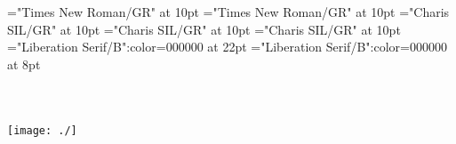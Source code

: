 \documentclass[a4paper,twoside]{article}
\begin{document}
\font\xitemptdefinitionLcptsensesensesentryletDatadicBody="Times New Roman/GR" at 10pt
\font\spanptxitemptdefinitionLcptsensesensesentryletDatadicBody="Times New Roman/GR" at 10pt
\font\spanendefinitionLcptsensesensesentryletDatadicBody="Charis SIL/GR" at 10pt
\font\xitemendefinitionLcptsensesensesentryletDatadicBody="Charis SIL/GR" at 10pt
\font\spanenxitemendefinitionLcptsensesensesentryletDatadicBody="Charis SIL/GR" at 10pt
\color{black} 
\thispagestyle{empty} 
\font\CoverPageTitle="Liberation Serif/B":color=000000 at 22pt 
\font\pFrontMatterdiv="Liberation Serif/B":color=000000 at 8pt 
\vskip 60pt 
\begin{center} 
\end{center} 
\newpage 
\newpage 
\thispagestyle{empty} 
\mbox{} 
\begin{titlepage}
\begin{center}
\textsc{\LARGE {}}\\[1.5cm] 
\vspace{110 mm} 
\textsc{ }\\[0.5cm] 
\texttt{[image: ./]}\\[1cm]    
\end{center} 
\end{titlepage} 
\setcounter{page}{3} 
 
\pagestyle{plain} 
\newpage 
\end{document}
